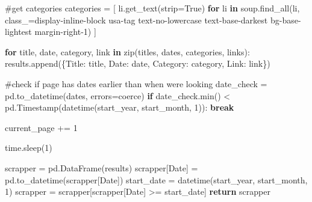 \documentclass[
  letterpaper,
  DIV=11,
  numbers=noendperiod]{scrartcl}
\newenvironment{Shaded}{\begin{snugshade}}{\end{snugshade}}
\newcommand{\BuiltInTok}[1]{\textcolor[rgb]{0.00,0.23,0.31}{#1}}
\newcommand{\CommentTok}[1]{\textcolor[rgb]{0.37,0.37,0.37}{#1}}
\newcommand{\ControlFlowTok}[1]{\textcolor[rgb]{0.00,0.23,0.31}{\textbf{#1}}}
\newcommand{\DecValTok}[1]{\textcolor[rgb]{0.68,0.00,0.00}{#1}}
\newcommand{\KeywordTok}[1]{\textcolor[rgb]{0.00,0.23,0.31}{\textbf{#1}}}
\newcommand{\NormalTok}[1]{\textcolor[rgb]{0.00,0.23,0.31}{#1}}
\newcommand{\OperatorTok}[1]{\textcolor[rgb]{0.37,0.37,0.37}{#1}}
\newcommand{\StringTok}[1]{\textcolor[rgb]{0.13,0.47,0.30}{#1}}
\newcommand{\VariableTok}[1]{\textcolor[rgb]{0.07,0.07,0.07}{#1}}
\begin{document}
\begin{Shaded}
\begin{Highlighting}[]
        \CommentTok{\#get categories}
\NormalTok{        categories }\OperatorTok{=}\NormalTok{ [}
\NormalTok{            li.get\_text(strip}\OperatorTok{=}\VariableTok{True}\NormalTok{) }\ControlFlowTok{for}\NormalTok{ li }\KeywordTok{in}\NormalTok{ soup.find\_all(}\StringTok{\textquotesingle{}li\textquotesingle{}}\NormalTok{, class\_}\OperatorTok{=}\StringTok{\textquotesingle{}display{-}inline{-}block usa{-}tag text{-}no{-}lowercase text{-}base{-}darkest bg{-}base{-}lightest margin{-}right{-}1\textquotesingle{}}\NormalTok{)}
\NormalTok{        ]}

        \ControlFlowTok{for}\NormalTok{ title, date, category, link }\KeywordTok{in} \BuiltInTok{zip}\NormalTok{(titles, dates, categories, links):}
\NormalTok{            results.append(\{}\StringTok{\textquotesingle{}Title\textquotesingle{}}\NormalTok{: title, }\StringTok{\textquotesingle{}Date\textquotesingle{}}\NormalTok{: date, }\StringTok{\textquotesingle{}Category\textquotesingle{}}\NormalTok{: category, }\StringTok{\textquotesingle{}Link\textquotesingle{}}\NormalTok{: link\})}

        \CommentTok{\#check if page has dates earlier than when we\textquotesingle{}re looking}
\NormalTok{        date\_check }\OperatorTok{=}\NormalTok{ pd.to\_datetime(dates, errors}\OperatorTok{=}\StringTok{\textquotesingle{}coerce\textquotesingle{}}\NormalTok{)}
        \ControlFlowTok{if}\NormalTok{ date\_check.}\BuiltInTok{min}\NormalTok{() }\OperatorTok{\textless{}}\NormalTok{ pd.Timestamp(datetime(start\_year, start\_month, }\DecValTok{1}\NormalTok{)):}
            \ControlFlowTok{break}
        
\NormalTok{        current\_page }\OperatorTok{+=} \DecValTok{1}


        
\NormalTok{        time.sleep(}\DecValTok{1}\NormalTok{)}

    
\NormalTok{    scrapper }\OperatorTok{=}\NormalTok{ pd.DataFrame(results)}
\NormalTok{    scrapper[}\StringTok{\textquotesingle{}Date\textquotesingle{}}\NormalTok{] }\OperatorTok{=}\NormalTok{ pd.to\_datetime(scrapper[}\StringTok{\textquotesingle{}Date\textquotesingle{}}\NormalTok{])}
\NormalTok{    start\_date }\OperatorTok{=}\NormalTok{ datetime(start\_year, start\_month, }\DecValTok{1}\NormalTok{)}
\NormalTok{    scrapper }\OperatorTok{=}\NormalTok{ scrapper[scrapper[}\StringTok{\textquotesingle{}Date\textquotesingle{}}\NormalTok{] }\OperatorTok{\textgreater{}=}\NormalTok{ start\_date]}
    \ControlFlowTok{return}\NormalTok{ scrapper}
\end{Highlighting}
\end{Shaded}
\end{document}
